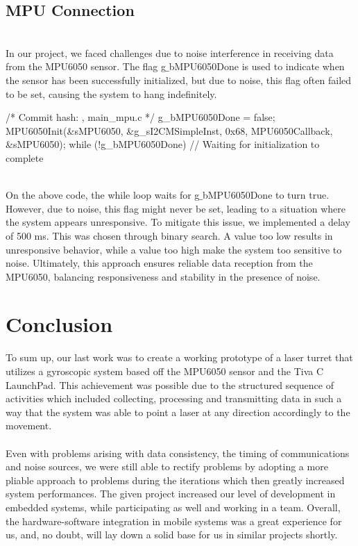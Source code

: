 \documentclass[12pt, a4paper]{article}
\begin{document}
\subsection{MPU Connection}
\text{}\\
In our project, we faced challenges due to noise interference in receiving data from the MPU6050 sensor. 
The flag g$\_$bMPU6050Done is used to indicate when the sensor has been successfully initialized, 
but due to noise, this flag often failed to be set, causing the system to hang indefinitely. 
\begin{code}
/* Commit hash: , main_mpu.c */
g_bMPU6050Done = false;
MPU6050Init(&sMPU6050, &g_sI2CMSimpleInst, 0x68, MPU6050Callback, &sMPU6050);
while (!g_bMPU6050Done) {
    // Waiting for initialization to complete
}
\end{code}\text{}\\
On the above code, the while loop waits for g$\_$bMPU6050Done to turn true. 
However, due to noise, this flag might never be set, leading to a situation where the system appears unresponsive. 
To mitigate this issue, we implemented a delay of 500 ms. This was chosen through binary search. 
A value too low results in unresponsive behavior, while a value too high make the system too sensitive to noise. 
Ultimately, this approach ensures reliable data reception from the MPU6050, balancing responsiveness and stability in the presence of noise.

\section{Conclusion}
To sum up, our last work was to create a working prototype of a laser turret that utilizes a gyroscopic system based off the MPU6050 sensor and the Tiva C LaunchPad. 
This achievement was possible due to the structured sequence of activities which included collecting, 
processing and transmitting data in such a way that the system was able to point a laser at any direction 
accordingly to the movement.
\\\\
Even with problems arising with data consistency, the timing of communications and noise sources, 
we were still able to rectify problems by adopting a more pliable approach to problems during the iterations 
which then greatly increased system performances. The given project increased our level of development in embedded systems, 
while participating as well and working in a team. Overall, the hardware-software integration in mobile systems was a great 
experience for us, and, no doubt, will lay down a solid base for us in similar projects shortly.
\end{document}
